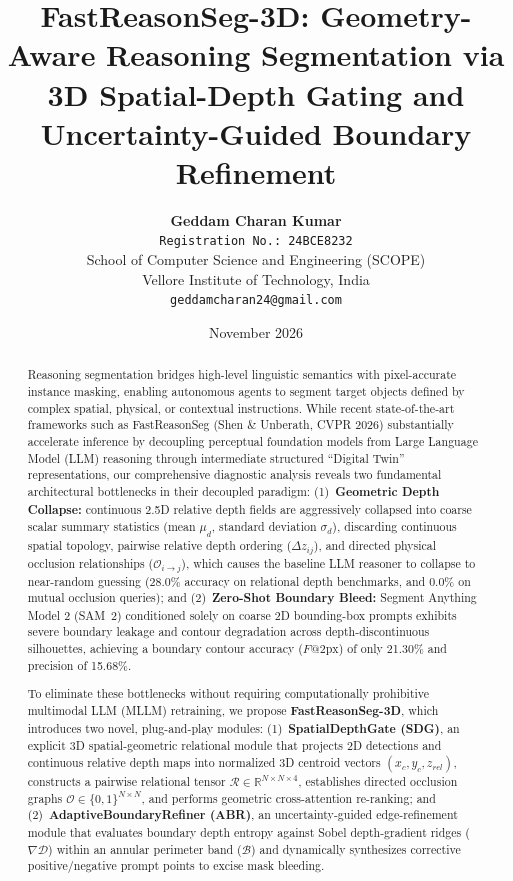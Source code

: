 \documentclass[10pt,twocolumn,letterpaper]{article}
\title{\textbf{FastReasonSeg-3D: Geometry-Aware Reasoning Segmentation via 3D Spatial-Depth Gating and Uncertainty-Guided Boundary Refinement}}
\author{
  \textbf{Geddam Charan Kumar} \\
  \texttt{Registration No.: 24BCE8232} \\
  School of Computer Science and Engineering (SCOPE) \\
  Vellore Institute of Technology, India \\
  \texttt{geddamcharan24@gmail.com}
}
\date{November 2026}
\begin{document}
\maketitle

\begin{abstract}
Reasoning segmentation bridges high-level linguistic semantics with pixel-accurate instance masking, enabling autonomous agents to segment target objects defined by complex spatial, physical, or contextual instructions. While recent state-of-the-art frameworks such as FastReasonSeg (Shen \& Unberath, CVPR 2026) substantially accelerate inference by decoupling perceptual foundation models from Large Language Model (LLM) reasoning through intermediate structured ``Digital Twin'' representations, our comprehensive diagnostic analysis reveals two fundamental architectural bottlenecks in their decoupled paradigm:
(1)~\textbf{Geometric Depth Collapse:} continuous 2.5D relative depth fields are aggressively collapsed into coarse scalar summary statistics (mean $\mu_d$, standard deviation $\sigma_d$), discarding continuous spatial topology, pairwise relative depth ordering ($\Delta z_{ij}$), and directed physical occlusion relationships ($\mathcal{O}_{i \to j}$), which causes the baseline LLM reasoner to collapse to near-random guessing (28.0\% accuracy on relational depth benchmarks, and 0.0\% on mutual occlusion queries); and
(2)~\textbf{Zero-Shot Boundary Bleed:} Segment Anything Model 2 (SAM~2) conditioned solely on coarse 2D bounding-box prompts exhibits severe boundary leakage and contour degradation across depth-discontinuous silhouettes, achieving a boundary contour accuracy ($F@2\text{px}$) of only 21.30\% and precision of 15.68\%.

To eliminate these bottlenecks without requiring computationally prohibitive multimodal LLM (MLLM) retraining, we propose \textbf{FastReasonSeg-3D}, which introduces two novel, plug-and-play modules:
(1)~\textbf{SpatialDepthGate (SDG)}, an explicit 3D spatial-geometric relational module that projects 2D detections and continuous relative depth maps into normalized 3D centroid vectors $(x_c, y_c, z_{rel})$, constructs a pairwise relational tensor $\mathcal{R} \in \mathbb{R}^{N \times N \times 4}$, establishes directed occlusion graphs $\mathcal{O} \in \{0, 1\}^{N \times N}$, and performs geometric cross-attention re-ranking; and
(2)~\textbf{AdaptiveBoundaryRefiner (ABR)}, an uncertainty-guided edge-refinement module that evaluates boundary depth entropy against Sobel depth-gradient ridges ($\nabla \mathcal{D}$) within an annular perimeter band ($\mathcal{B}$) and dynamically synthesizes corrective positive/negative prompt points to excise mask bleeding.


\end{abstract}
\end{document}
